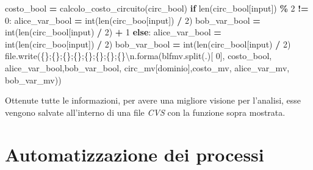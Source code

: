 \documentclass[
]{book}
\newenvironment{Shaded}{\begin{snugshade}}{\end{snugshade}}
\newcommand{\BuiltInTok}[1]{#1}
\newcommand{\CharTok}[1]{\textcolor[rgb]{0.31,0.60,0.02}{#1}}
\newcommand{\ControlFlowTok}[1]{\textcolor[rgb]{0.13,0.29,0.53}{\textbf{#1}}}
\newcommand{\DecValTok}[1]{\textcolor[rgb]{0.00,0.00,0.81}{#1}}
\newcommand{\NormalTok}[1]{#1}
\newcommand{\OperatorTok}[1]{\textcolor[rgb]{0.81,0.36,0.00}{\textbf{#1}}}
\newcommand{\SpecialCharTok}[1]{\textcolor[rgb]{0.00,0.00,0.00}{#1}}
\newcommand{\StringTok}[1]{\textcolor[rgb]{0.31,0.60,0.02}{#1}}
\begin{document}
\begin{Shaded}
\begin{Highlighting}[]
\NormalTok{      costo\_bool }\OperatorTok{=}\NormalTok{ calcolo\_costo\_circuito(circ\_bool)}
      \ControlFlowTok{if} \BuiltInTok{len}\NormalTok{(circ\_bool[}\StringTok{\textquotesingle{}input\textquotesingle{}}\NormalTok{]) }\OperatorTok{\%} \DecValTok{2} \OperatorTok{!=} \DecValTok{0}\NormalTok{:}
\NormalTok{          alice\_var\_bool }\OperatorTok{=} \BuiltInTok{int}\NormalTok{(}\BuiltInTok{len}\NormalTok{(circ\_boo[}\StringTok{\textquotesingle{}input\textquotesingle{}}\NormalTok{]) }\OperatorTok{/} \DecValTok{2}\NormalTok{)}
\NormalTok{          bob\_var\_bool }\OperatorTok{=} \BuiltInTok{int}\NormalTok{(}\BuiltInTok{len}\NormalTok{(circ\_bool[}\StringTok{\textquotesingle{}input\textquotesingle{}}\NormalTok{) }\OperatorTok{/} \DecValTok{2}\NormalTok{) }\OperatorTok{+} \DecValTok{1}
      \ControlFlowTok{else}\NormalTok{:}
\NormalTok{          alice\_var\_bool }\OperatorTok{=} \BuiltInTok{int}\NormalTok{(}\BuiltInTok{len}\NormalTok{(circ\_boo[}\StringTok{\textquotesingle{}input\textquotesingle{}}\NormalTok{]) }\OperatorTok{/} \DecValTok{2}\NormalTok{)}
\NormalTok{          bob\_var\_bool }\OperatorTok{=} \BuiltInTok{int}\NormalTok{(}\BuiltInTok{len}\NormalTok{(circ\_bool[}\StringTok{\textquotesingle{}input\textquotesingle{}}\NormalTok{) }\OperatorTok{/} \DecValTok{2}\NormalTok{)}
      \BuiltInTok{file}\NormalTok{.write(}\StringTok{\textquotesingle{}}\SpecialCharTok{\{\}}\StringTok{;}\SpecialCharTok{\{\}}\StringTok{;}\SpecialCharTok{\{\}}\StringTok{;}\SpecialCharTok{\{\}}\StringTok{;}\SpecialCharTok{\{\}}\StringTok{;}\SpecialCharTok{\{\}}\StringTok{;}\SpecialCharTok{\{\}}\StringTok{;}\SpecialCharTok{\{\}}\CharTok{\textbackslash{}n}\StringTok{\textquotesingle{}}\NormalTok{.forma(blfmv.split(}\StringTok{\textquotesingle{}.\textquotesingle{}}\NormalTok{)[}
          \DecValTok{0}\NormalTok{], costo\_bool, alice\_var\_bool,bob\_var\_bool, circ\_mv[}\StringTok{\textquotesingle{}dominio\textquotesingle{}}\NormalTok{],costo\_mv, alice\_var\_mv, bob\_var\_mv))}
\end{Highlighting}
\end{Shaded}

Ottenute tutte le informazioni, per avere una migliore visione per l'analisi, esse vengono salvate all'interno di una file \emph{CVS} con la funzione sopra mostrata.

\newpage

\hypertarget{automatizzazione-dei-processi}{%
\section{Automatizzazione dei processi}\label{automatizzazione-dei-processi}}
\end{document}
